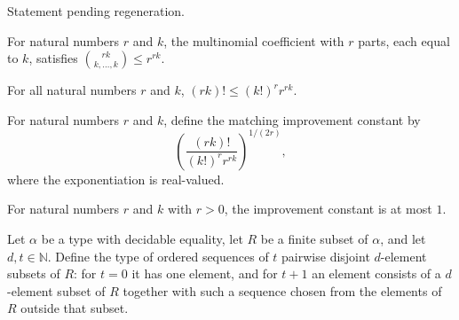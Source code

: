 \begin{theorem}
\label{FABL.homogeneous_uniformLpNorm_le_sqrt_two_mul}
\leanok
{}
Statement pending regeneration.
\end{theorem}

\begin{theorem}
\label{FABL.multinomial_const_le_pow}
\leanok
{}
For natural numbers $r$ and $k$, the multinomial coefficient with $r$ parts, each equal
to $k$, satisfies $\binom{rk}{k,\ldots,k} \le r^{rk}$.
\end{theorem}

\begin{theorem}
\label{FABL.factorial_mul_le_factorial_pow_mul_pow}
\leanok
{}
For all natural numbers $r$ and $k$, $(rk)!\le (k!)^r r^{rk}$.
\end{theorem}

\begin{definition}
\label{FABL.matchingImprovementConstant}
\leanok
For natural numbers $r$ and $k$, define the matching improvement constant by
\[\left(\frac{(rk)!}{(k!)^r r^{rk}}\right)^{1/(2r)},\] where the exponentiation is
real-valued.
\end{definition}

\begin{theorem}
\label{FABL.matchingImprovementConstant_le_one}
\leanok
{}
For natural numbers $r$ and $k$ with $r>0$, the improvement constant is at most $1$.
\end{theorem}

\begin{definition}
\label{FABL.DisjointBlockChoices}
\leanok
Let $\alpha$ be a type with decidable equality, let $R$ be a finite subset of $\alpha$,
and let $d,t\in\mathbb{N}$. Define the type of ordered sequences of $t$ pairwise
disjoint $d$-element subsets of $R$: for $t=0$ it has one element, and for $t+1$ an
element consists of a $d$-element subset of $R$ together with such a sequence chosen
from the elements of $R$ outside that subset.
\end{definition}

